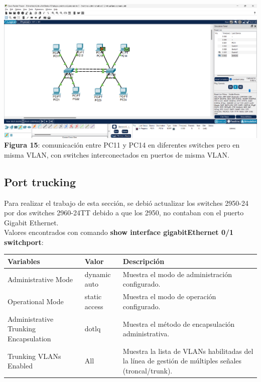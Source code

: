 \documentclass{article}
\begin{document}
    \begin{center}
        \includegraphics[width=0.775\linewidth]{img_19}  
        \linebreak
        \small {\bfseries Figura 15}: comunicación entre PC11 y PC14 en diferentes switches pero en misma VLAN, con switches interconectados en puertos de misma VLAN.
    \end{center}

    \subsection{Port trucking}
    Para realizar el trabajo de esta sección, se debió actualizar los switches 2950-24 por dos switches 2960-24TT debido a que los 2950, no contaban con el puerto Gigabit Ethernet.\\
    Valores encontrados con comando {\bfseries show interface gigabitEthernet 0/1 switchport}:

    \begin{center}
        \begin{tabular}{| p{4cm} | p{3cm} | p{11cm} |}\hline
            {\bfseries Variables} & {\bfseries Valor} & {\bfseries Descripción} \\\hline
            Administrative Mode & dynamic auto & Muestra el modo de administración configurado. \\\hline
            Operational Mode & static access & Muestra el modo de operación configurado. \\\hline
            Administrative Trunking Encapsulation & dotlq & Muestra el método de encapsulación administrativa. \\\hline
            Trunking VLANs Enabled & All & Muestra la lista de VLANs habilitadas del la línea de gestión de múltiples señales (troncal/trunk). \\\hline
        \end{tabular}
    \end{center}
\end{document}
